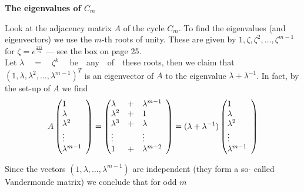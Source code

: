\begin{mdframed}[nobreak=true,backgroundcolor=gray!15]
\vspace{8pt}
{\Large\textbf{The eigenvalues of $C_m$}}
\vspace{5pt}

Look at the adjacency matrix $A$ of the cycle $C_m$. To find the eigenvalues 
(and eigenvectors) we use the $m$-th roots of unity. These are 
given by $1, \zeta, \zeta^2, \ldots, \zeta^{m-1}$ for $\zeta = e^{\frac{2\pi i}{m}}$ --- see the box on page 25.\\ 
Let $\lambda \quad=\quad\zeta ^k$ \ \ be\ \  any\ \  of\ \  these roots, then we claim that
$(1, \lambda, \lambda^2, \ldots, \lambda^{m-1})^T$ is an eigenvector of $A$ to the eigenvalue $\lambda + \lambda^{-1}$.
In fact, by the set-up of $A$ we find\\

\[
A \begin{pmatrix}
    \begin{array}{@{}*{5}{l}@{}}
    1 \\
    \lambda \\
    \lambda^2 \\
    \vdots \\
    \lambda^{m-1}
    \end{array}
\end{pmatrix}
=
\begin{pmatrix}
    \begin{array}{@{}*{5}{l}@{}}
    \lambda & + & \lambda^{m-1} \\
    \lambda^2 & + & 1 \\
    \lambda^3 & + & \lambda \\
    \vdots & & \vdots \\
    1 & + & \lambda^{m-2}
    \end{array}
\end{pmatrix}
=
(\lambda + \lambda^{-1})
\begin{pmatrix}
    \begin{array}{@{}*{5}{l}@{}}
    1 \\
    \lambda \\
    \lambda^2 \\
    \vdots \\
    \lambda^{m-1}
    \end{array}
\end{pmatrix}
\]

Since the vectors $(1, \lambda, \ldots, \lambda^{m-1})$ are independent (they form a so-
called Vandermonde matrix) we conclude that for odd $m$


\end{mdframed}
